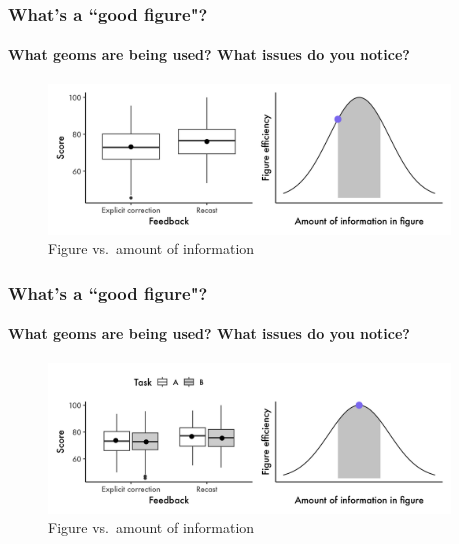 \documentclass[xcolor=dvipsnames, handout, onlymath, 10pt, aspectratio=169]{beamer}
\begin{document}
\begin{frame}
	\frametitle{What's a ``good figure"?}
	\framesubtitle{What geoms are being used? What issues do you notice?}

	\begin{figure}
		\begin{center}
			\includegraphics[width=0.95\textwidth]{ex3.jpeg}
		\end{center}
		\caption{Figure vs.\ amount of information}\label{fig:f3}
	\end{figure}

\end{frame}

\begin{frame}
	\frametitle{What's a ``good figure"?}
	\framesubtitle{What geoms are being used? What issues do you notice?}

	\begin{figure}
		\begin{center}
			\includegraphics[width=0.95\textwidth]{ex4.jpeg}
		\end{center}
		\caption{Figure vs.\ amount of information}\label{fig:f4}
	\end{figure}

\end{frame}
\end{document}

